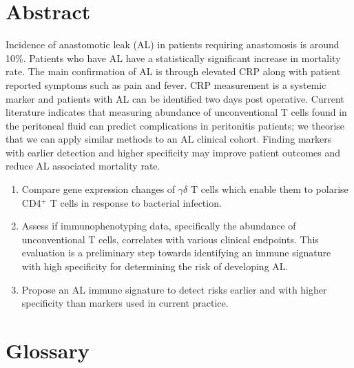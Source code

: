 
\chapter*{\label{intro}Abstract}

\setcounter{equation}{0}
\setcounter{table}{0}
\setcounter{figure}{0}

Incidence of anastomotic leak (AL) in patients requiring anastomosis is around 10\%. Patients who have AL have a statistically significant increase in mortality rate. The main confirmation of AL is through elevated CRP along with patient reported symptoms such as pain and fever. CRP measurement is a systemic marker and patients with AL can be identified two days post operative. Current literature indicates that measuring abundance of unconventional T cells found in the peritoneal fluid can predict complications in peritonitis patients; we theorise that we can apply similar methods to an AL clinical cohort. Finding markers with earlier detection and higher specificity may improve patient outcomes and reduce AL associated mortality rate.

\begin{enumerate}
    \item Compare gene expression changes of $\gamma\delta$ T cells which enable them to polarise CD4$^+$ T cells in response to bacterial infection.
    \item Assess if immunophenotyping data, specifically the abundance of unconventional T cells, correlates with various clinical endpoints. This evaluation is a preliminary step towards identifying an immune signature with high specificity for determining the risk of developing AL.
    \item Propose an AL immune signature to detect risks earlier and with higher specificity than markers used in current practice.
\end{enumerate}

\clearpage

\chapter*{\label{intro}Glossary}

\setcounter{equation}{0}
\setcounter{table}{0}
\setcounter{figure}{0}

